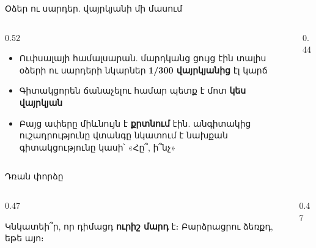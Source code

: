 \begin{frame}{Օձեր ու սարդեր. վայրկյանի մի մասում}
  \begin{columns}[T]
    \begin{column}{0.52\textwidth}
      \begin{itemize}
        \item Ուփսալայի համալսարան. մարդկանց ցույց էին տալիս օձերի ու սարդերի նկարներ \textbf{1/300 վայրկյանից} էլ կարճ
        \item<2-> Գիտակցորեն ճանաչելու համար պետք է մոտ \textbf{կես վայրկյան}
        \item<3-> Բայց ափերը միևնույն է \textbf{քրտնում} էին. անգիտակից ուշադրությունը վտանգը նկատում է նախքան գիտակցությունը կասի՝ «Հը՞, ի՞նչ»
      \end{itemize}
    \end{column}
    \begin{column}{0.44\textwidth}
      \centering
      \ \par\medskip
    \end{column}
  \end{columns}
\end{frame}

\begin{frame}{Դռան փորձը}
  \centering
  \par
  \begin{columns}[T]
    \begin{column}{0.47\textwidth}
      \begin{poll}
        Կնկատեի՞ր, որ դիմացդ \textbf{ուրիշ մարդ} է։ Բարձրացրու ձեռքդ, եթե այո։
      \end{poll}
    \end{column}
    \begin{column}{0.47\textwidth}
    \end{column}
  \end{columns}
\end{frame}

